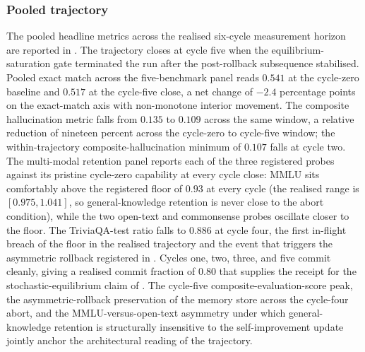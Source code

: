 \subsubsection{Pooled trajectory}
\label{sec:headline-pooled}

The pooled headline metrics across the realised six-cycle measurement horizon are reported in . The trajectory closes at cycle five when the equilibrium-saturation gate terminated the run after the post-rollback subsequence stabilised. Pooled exact match across the five-benchmark panel reads $0.541$ at the cycle-zero baseline and $0.517$ at the cycle-five close, a net change of $-2.4$ percentage points on the exact-match axis with non-monotone interior movement. The composite hallucination metric falls from $0.135$ to $0.109$ across the same window, a relative reduction of nineteen percent across the cycle-zero to cycle-five window; the within-trajectory composite-hallucination minimum of $0.107$ falls at cycle two. The multi-modal retention panel reports each of the three registered probes against its pristine cycle-zero capability at every cycle close: MMLU sits comfortably above the registered floor of $0.93$ at every cycle (the realised range is $[0.975, 1.041]$, so general-knowledge retention is never close to the abort condition), while the two open-text and commonsense probes oscillate closer to the floor. The TriviaQA-test ratio falls to $0.886$ at cycle four, the first in-flight breach of the floor in the realised trajectory and the event that triggers the asymmetric rollback registered in . Cycles one, two, three, and five commit cleanly, giving a realised commit fraction of $0.80$ that supplies the receipt for the stochastic-equilibrium claim of . The cycle-five composite-evaluation-score peak, the asymmetric-rollback preservation of the memory store across the cycle-four abort, and the MMLU-versus-open-text asymmetry under which general-knowledge retention is structurally insensitive to the self-improvement update jointly anchor the architectural reading of the trajectory.



